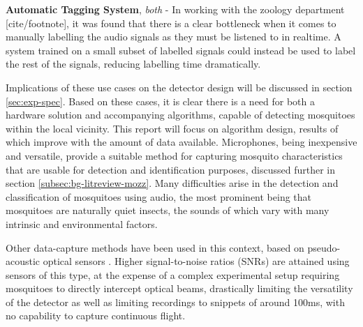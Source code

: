 \begin{sitemize}
            \item{\textbf{Automatic Tagging System}, \textit{both} - In working with the zoology department [cite/footnote], it was found that there is a clear bottleneck when it comes to manually labelling the audio signals as they must be listened to in realtime. A system trained on a small subset of labelled signals could instead be used to label the rest of the signals, reducing labelling time dramatically.}
        \end{sitemize}
        Implications of these use cases on the detector design will be discussed in section \ref{sec:exp-spec}. Based on these cases, it is clear there is a need for both a hardware solution and accompanying algorithms, capable of detecting mosquitoes within the local vicinity. This report will focus on algorithm design, results of which improve with the amount of data available. Microphones, being inexpensive and versatile, provide a suitable method for capturing mosquito characteristics that are usable for detection and identification purposes, discussed further in section \ref{subsec:bg-litreview-mozz}. Many difficulties arise in the detection and classification of mosquitoes using audio, the most prominent being that mosquitoes are naturally quiet insects, the sounds of which vary with many intrinsic and environmental factors.
        
        Other data-capture methods have been used in this context, based on pseudo-acoustic optical sensors \cite{Chen2014}. Higher signal-to-noise ratios (SNRs) are attained using sensors of this type, at the expense of a complex experimental setup requiring mosquitoes to directly intercept optical beams, drastically limiting the versatility of the detector as well as limiting recordings to snippets of around 100ms, with no capability to capture continuous flight. 
        
        
        
        
  
